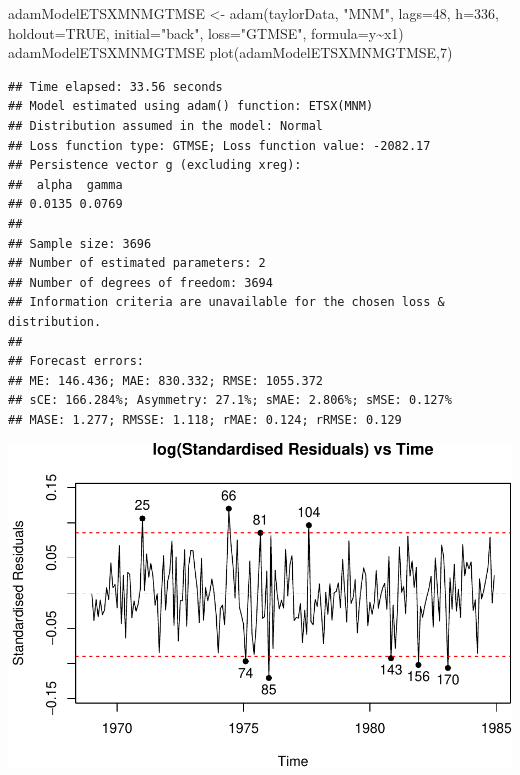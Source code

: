 \documentclass[
]{book}
\newenvironment{Shaded}{\begin{snugshade}}{\end{snugshade}}
\newcommand{\AttributeTok}[1]{\textcolor[rgb]{0.77,0.63,0.00}{#1}}
\newcommand{\ConstantTok}[1]{\textcolor[rgb]{0.00,0.00,0.00}{#1}}
\newcommand{\DecValTok}[1]{\textcolor[rgb]{0.00,0.00,0.81}{#1}}
\newcommand{\FunctionTok}[1]{\textcolor[rgb]{0.00,0.00,0.00}{#1}}
\newcommand{\NormalTok}[1]{#1}
\newcommand{\OtherTok}[1]{\textcolor[rgb]{0.56,0.35,0.01}{#1}}
\newcommand{\SpecialCharTok}[1]{\textcolor[rgb]{0.00,0.00,0.00}{#1}}
\newcommand{\StringTok}[1]{\textcolor[rgb]{0.31,0.60,0.02}{#1}}
\theoremstyle{definition}
\theoremstyle{definition}
\theoremstyle{definition}
\theoremstyle{definition}
\theoremstyle{remark}
\begin{document}
\begin{Shaded}
\begin{Highlighting}[]
\NormalTok{adamModelETSXMNMGTMSE }\OtherTok{\textless{}{-}} \FunctionTok{adam}\NormalTok{(taylorData, }\StringTok{"MNM"}\NormalTok{, }\AttributeTok{lags=}\DecValTok{48}\NormalTok{,}
                              \AttributeTok{h=}\DecValTok{336}\NormalTok{, }\AttributeTok{holdout=}\ConstantTok{TRUE}\NormalTok{,}
                              \AttributeTok{initial=}\StringTok{"back"}\NormalTok{, }\AttributeTok{loss=}\StringTok{"GTMSE"}\NormalTok{,}
                              \AttributeTok{formula=}\NormalTok{y}\SpecialCharTok{\textasciitilde{}}\NormalTok{x1)}
\NormalTok{adamModelETSXMNMGTMSE}
\FunctionTok{plot}\NormalTok{(adamModelETSXMNMGTMSE,}\DecValTok{7}\NormalTok{)}
\end{Highlighting}
\end{Shaded}

\begin{verbatim}
## Time elapsed: 33.56 seconds
## Model estimated using adam() function: ETSX(MNM)
## Distribution assumed in the model: Normal
## Loss function type: GTMSE; Loss function value: -2082.17
## Persistence vector g (excluding xreg):
##  alpha  gamma 
## 0.0135 0.0769 
## 
## Sample size: 3696
## Number of estimated parameters: 2
## Number of degrees of freedom: 3694
## Information criteria are unavailable for the chosen loss & distribution.
## 
## Forecast errors:
## ME: 146.436; MAE: 830.332; RMSE: 1055.372
## sCE: 166.284%; Asymmetry: 27.1%; sMAE: 2.806%; sMSE: 0.127%
## MASE: 1.277; RMSSE: 1.118; rMAE: 0.124; rRMSE: 0.129
\end{verbatim}

\includegraphics{adam_files/figure-latex/unnamed-chunk-116-1.pdf}
\end{document}
